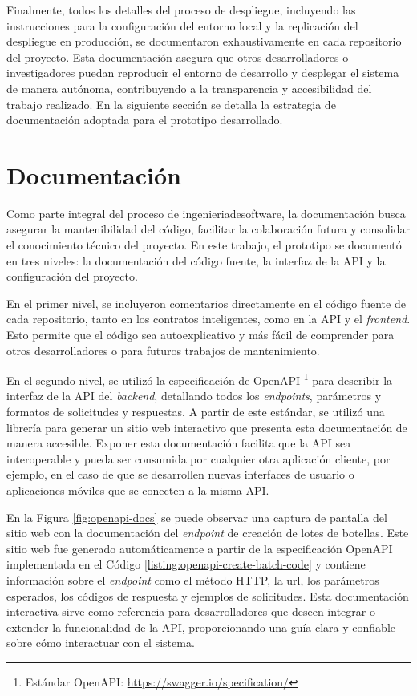 Finalmente, todos los detalles del proceso de despliegue, incluyendo las instrucciones para la configuración del entorno local y la replicación del despliegue en producción, se documentaron exhaustivamente en cada repositorio del proyecto. Esta documentación asegura que otros desarrolladores o investigadores puedan reproducir el entorno de desarrollo y desplegar el sistema de manera autónoma, contribuyendo a la transparencia y accesibilidad del trabajo realizado. En la siguiente sección se detalla la estrategia de documentación adoptada para el prototipo desarrollado.

\section{Documentación}
\label{sec:documentation}

Como parte integral del proceso de \gls{ingenieriadesoftware}, la documentación busca asegurar la mantenibilidad del código, facilitar la colaboración futura y consolidar el conocimiento técnico del proyecto. En este trabajo, el prototipo se documentó en tres niveles: la documentación del código fuente, la interfaz de la API y la configuración del proyecto.

En el primer nivel, se incluyeron comentarios directamente en el código fuente de cada repositorio, tanto en los contratos inteligentes, como en la API y el \textit{\gls{frontend}}. Esto permite que el código sea autoexplicativo y más fácil de comprender para otros desarrolladores o para futuros trabajos de mantenimiento. 

En el segundo nivel, se utilizó la especificación de OpenAPI \footnote{Estándar OpenAPI: \url{https://swagger.io/specification/}} para describir la interfaz de la API del \textit{\gls{backend}}, detallando todos los \textit{endpoints}, parámetros y formatos de solicitudes y respuestas. A partir de este estándar, se utilizó una librería para generar un sitio web interactivo que presenta esta documentación de manera accesible. Exponer esta documentación facilita que la API sea interoperable y pueda ser consumida por cualquier otra aplicación cliente, por ejemplo, en el caso de que se desarrollen nuevas interfaces de usuario o aplicaciones móviles que se conecten a la misma API. 

En la Figura \ref{fig:openapi-docs} se puede observar una captura de pantalla del sitio web con la documentación del \textit{\gls{endpoint}} de creación de lotes de botellas. Este sitio web fue generado automáticamente a partir de la especificación OpenAPI implementada en el Código \ref{listing:openapi-create-batch-code} y contiene información sobre el \textit{endpoint} como el método HTTP, la \gls{url}, los parámetros esperados, los códigos de respuesta y ejemplos de solicitudes. Esta documentación interactiva sirve como referencia para desarrolladores que deseen integrar o extender la funcionalidad de la API, proporcionando una guía clara y confiable sobre cómo interactuar con el sistema.


